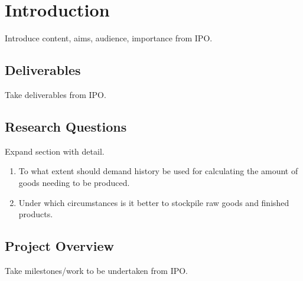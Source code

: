 \section{Introduction}

Introduce content, aims, audience, importance from IPO\@.

\subsection{Deliverables}

Take deliverables from IPO\@.

\subsection{Research Questions}\label{sec:research_questions}

Expand section with detail.

\begin{enumerate}
    \item To what extent should demand history be used for calculating the amount of goods needing to be produced.
    \item Under which circumstances is it better to stockpile raw goods and finished products.
\end{enumerate}

\subsection{Project Overview}

Take milestones/work to be undertaken from IPO\@.
